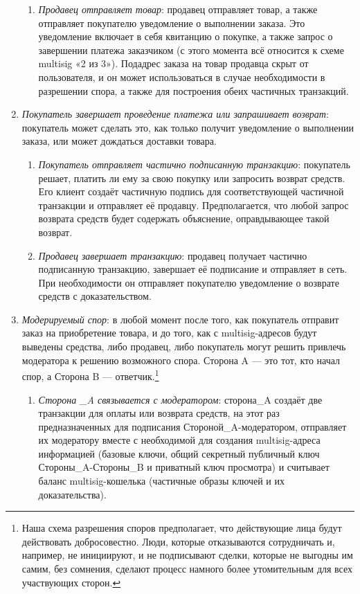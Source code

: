 \begin{enumerate}
\begin{enumerate}
        \item {\em Продавец отправляет товар}: продавец отправляет товар, а также отправляет покупателю уведомление о выполнении заказа. Это уведомление включает в себя квитанцию о покупке, а также запрос о завершении платежа заказчиком (с этого момента всё относится к схеме multisig «2 из 3»). Подадрес заказа на товар продавца скрыт от пользователя, и он может использоваться в случае необходимости в разре\-шении спора, а также для построения обеих частичных транзакций.
    \end{enumerate}{}
    \item {\em Покупатель завершает проведение платежа или запрашивает возврат}: покупатель может сделать это, как только получит уведомление о выполнении заказа, или может дождаться доставки товара.
    \begin{enumerate}
        \item {\em Покупатель отправляет частично подписанную транзакцию}: покупатель решает, платить ли ему за свою покупку или запросить возврат средств. Его клиент создаёт частичную подпись для соответствующей частичной транзакции и отправляет её продавцу. Предполагается, что любой запрос возврата средств будет содержать объяснение, оправдывающее такой возврат.
        \item {\em Продавец завершает транзакцию}: продавец получает частично подписанную тран\-закцию, завершает её подписание и отправляет в сеть. При необходимости он отправляет покупателю уведомление о возврате средств с доказательством.
    \end{enumerate}{}
    \item {\em Модерируемый спор}: в любой момент после того, как покупатель отправит заказ на приобретение товара, и до того, как с multisig-адресов будут выведены средства, либо продавец, либо покупатель могут решить привлечь модератора к решению возможного спора. Сторона A — это тот, кто начал спор, а Сторона B — ответчик.\footnote{Наша схема разрешения споров предполагает, что действующие лица будут действовать добросовестно. Люди, которые отказываются сотрудничать и, например, не инициируют, и не подписывают сделки, которые не выгодны им самим, без сомнения, сделают процесс намного более утомительным для всех участвующих сторон.}
    \begin{enumerate}
        \item {\em Сторона \_A связывается с модератором}: сторона\_A создаёт две транзакции для оплаты или возврата средств, на этот раз предназначенных для подписания Стороной\_A-модератором, отправляет их модератору вместе с необходимой для создания multisig-адреса информацией (базовые ключи, общий секретный публич\-ный ключ Стороны\_A-Стороны\_B и приватный ключ просмотра) и считывает баланс multisig-кошелька (частичные образы ключей и их доказательства).

\end{enumerate}
\end{enumerate}
